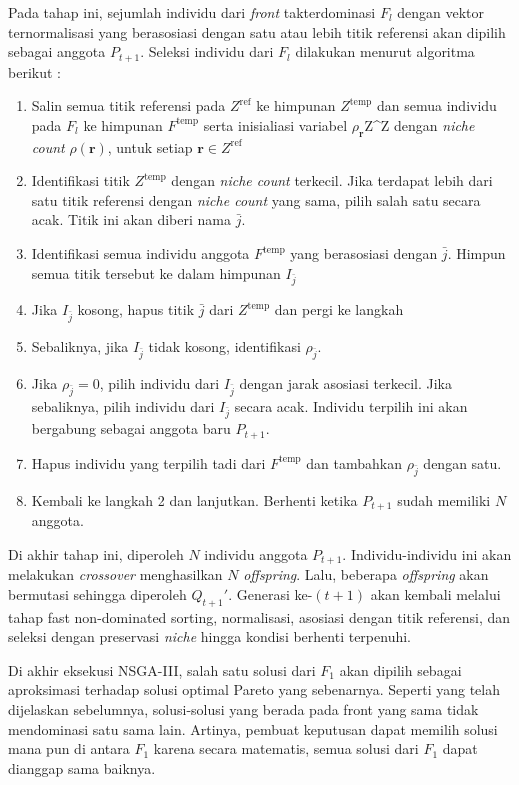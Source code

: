Pada tahap ini, sejumlah individu dari \textit{front} takterdominasi $F_l$ dengan vektor ternormalisasi yang berasosiasi dengan satu atau lebih titik referensi akan dipilih sebagai anggota $P_{t+1}$. Seleksi individu dari $F_l$ dilakukan menurut algoritma berikut :

\begin{enumerate}
  \item Salin semua titik referensi pada $Z^\text{ref}$ ke himpunan $Z^\text{temp}$ dan semua individu pada $F_l$ ke himpunan $F^\text{temp}$ serta inisialiasi variabel $\rho_{\mathbf{r}}$Z^Z dengan \textit{niche count} $\rho(\mathbf{r})$, untuk setiap $\mathbf{r}\in Z^\text{ref}$ 
  \item Identifikasi titik $Z^\text{temp}$ dengan \textit{niche count} terkecil. Jika terdapat lebih dari satu titik referensi dengan \textit{niche count} yang sama, pilih salah satu secara acak. Titik ini akan diberi nama $\bar{j}$.
  \item Identifikasi semua individu anggota $F^\text{temp}$ yang berasosiasi dengan $\bar{j}$. Himpun semua titik tersebut ke dalam himpunan $I_{\bar{j}}$
  \item Jika $I_{\bar{j}}$ kosong, hapus titik $\bar{j}$ dari $Z^\text{temp}$ dan pergi ke langkah \item Sebaliknya, jika $I_{\bar{j}}$ tidak kosong, identifikasi $\rho_\bar{j}$.
  \item Jika $\rho_\bar{j}=0$, pilih individu dari $I_{\bar{j}}$ dengan jarak asosiasi terkecil.  Jika sebaliknya, pilih individu dari $I_{\bar{j}}$ secara acak. Individu terpilih ini akan bergabung sebagai anggota baru $P_{t+1}$.
  \item Hapus individu yang terpilih tadi dari $F^\text{temp}$ dan tambahkan $\rho_\bar{j}$ dengan satu.
  \item Kembali ke langkah 2 dan lanjutkan. Berhenti ketika $P_{t+1}$ sudah memiliki $N$ anggota.
\end{enumerate}

Di akhir tahap ini, diperoleh $N$ individu anggota $P_{t+1}$. Individu-individu ini akan melakukan \textit{crossover} menghasilkan $N$ \textit{offspring}. Lalu, beberapa \textit{offspring} akan bermutasi sehingga diperoleh $Q_{t+1}'$. Generasi ke-$(t+1)$ akan kembali melalui tahap fast non-dominated sorting, normalisasi, asosiasi dengan titik referensi, dan seleksi dengan preservasi \textit{niche} hingga kondisi berhenti terpenuhi.

Di akhir eksekusi NSGA-III, salah satu solusi dari $F_1$ akan dipilih sebagai aproksimasi terhadap solusi optimal Pareto yang sebenarnya. Seperti yang telah dijelaskan sebelumnya, solusi-solusi yang berada pada front yang sama tidak mendominasi satu sama lain. Artinya, pembuat keputusan dapat memilih solusi mana pun di antara $F_1$ karena secara matematis, semua solusi dari $F_1$ dapat dianggap sama baiknya. 
